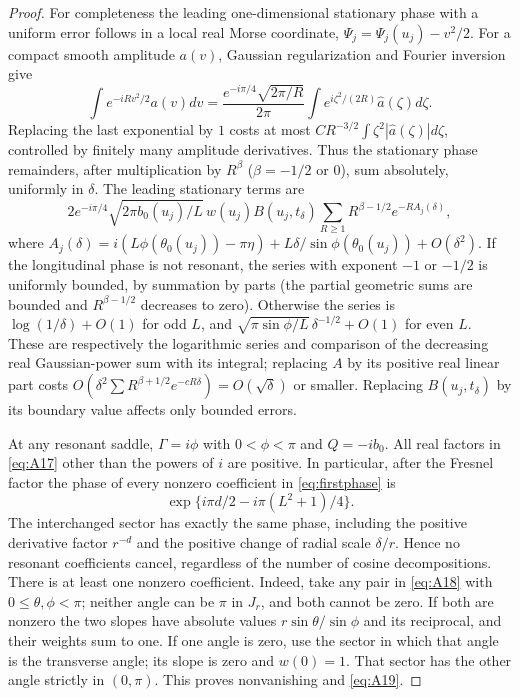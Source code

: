 \documentclass[11pt,a4paper]{article}
\numberwithin{equation}{section}
\theoremstyle{plain}
\theoremstyle{definition}
\begin{document}
\begin{proof}
For completeness the leading one-dimensional stationary phase with a uniform error follows in a local real Morse coordinate, $\Psi_j=\Psi_j(u_j)-v^2/2$. For a compact smooth amplitude $a(v)$, Gaussian regularization and Fourier inversion give
\[
\int e^{-iRv^2/2}a(v)dv=\frac{e^{-i\pi/4}\sqrt{2\pi/R}}{2\pi}
\int e^{i\zeta^2/(2R)}\widehat a(\zeta)d\zeta.
\]
Replacing the last exponential by $1$ costs at most $C R^{-3/2}\int\zeta^2|\widehat a(\zeta)|d\zeta$, controlled by finitely many amplitude derivatives. Thus the stationary phase remainders, after multiplication by $R^\beta$ ($\beta=-1/2$ or $0$), sum absolutely, uniformly in $\delta$. The leading stationary terms are
\begin{equation}
2e^{-i\pi/4}\sqrt{2\pi b_0(u_j)/L}\,w(u_j)B(u_j,t_\delta)\sum_{R\ge1}R^{\beta-1/2}e^{-RA_j(\delta)},\label{eq:firstphase}
\end{equation}
where $A_j(\delta)=i(L\phi(\theta_0(u_j))-\pi\eta)+L\delta/\sin\phi(\theta_0(u_j))+O(\delta^2)$. If the longitudinal phase is not resonant, the series with exponent $-1$ or $-1/2$ is uniformly bounded, by summation by parts (the partial geometric sums are bounded and $R^{\beta-1/2}$ decreases to zero). Otherwise the series is $\log(1/\delta)+O(1)$ for odd $L$, and $\sqrt{\pi\sin\phi/L}\,\delta^{-1/2}+O(1)$ for even $L$. These are respectively the logarithmic series and comparison of the decreasing real Gaussian-power sum with its integral; replacing $A$ by its positive real linear part costs $O(\delta^2\sum R^{\beta+1/2}e^{-cR\delta})=O(\sqrt\delta)$ or smaller. Replacing $B(u_j,t_\delta)$ by its boundary value affects only bounded errors.

At any resonant saddle, $\Gamma=i\phi$ with $0<\phi<\pi$ and $Q=-ib_0$. All real factors in \eqref{eq:A17} other than the powers of $i$ are positive. In particular, after the Fresnel factor the phase of every nonzero coefficient in \eqref{eq:firstphase} is
\begin{equation}
\exp\{i\pi d/2-i\pi(L^2+1)/4\}.\label{eq:commonphase}
\end{equation}
The interchanged sector has exactly the same phase, including the positive derivative factor $r^{-d}$ and the positive change of radial scale $\delta/r$. Hence no resonant coefficients cancel, regardless of the number of cosine decompositions. There is at least one nonzero coefficient. Indeed, take any pair in \eqref{eq:A18} with $0\le\theta,\phi<\pi$; neither angle can be $\pi$ in $J_r$, and both cannot be zero. If both are nonzero the two slopes have absolute values $r\sin\theta/\sin\phi$ and its reciprocal, and their weights sum to one. If one angle is zero, use the sector in which that angle is the transverse angle; its slope is zero and $w(0)=1$. That sector has the other angle strictly in $(0,\pi)$. This proves nonvanishing and \eqref{eq:A19}.
\end{proof}
\end{document}
